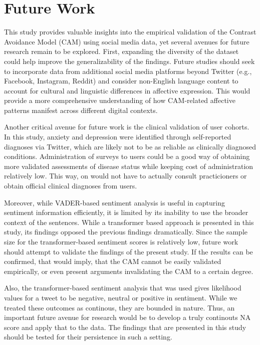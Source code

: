 

\section{Future Work}

This study provides valuable insights into the empirical validation of the Contrast Avoidance Model (CAM) using social media data, yet several avenues for future research remain to be explored. First, expanding the diversity of the dataset could help improve the generalizability of the findings. Future studies should seek to incorporate data from additional social media platforms beyond Twitter (e.g., Facebook, Instagram, Reddit) and consider non-English language content to account for cultural and linguistic differences in affective expression. This would provide a more comprehensive understanding of how CAM-related affective patterns manifest across different digital contexts.

Another critical avenue for future work is the clinical validation of user cohorts. In this study, anxiety and depression were identified through self-reported diagnoses via Twitter, which are likely not to be as reliable as clinically diagnosed conditions. Administration of surveys to users could be a good way of obtaining more validated assessments of disease status while keeping cost of administration relatively low. This way, on would not have to actually consult practicioners or obtain official clinical diagnoses from users.

Moreover, while VADER-based sentiment analysis is useful in capturing sentiment information efficiently, it is limited by its inability to use the broader context of the sentences. While a transformer based approach is presented in this study, its findings opposed the previous findings dramatically. Since the sample size for the transformer-based sentiment scores is relatively low, future work should attempt to validate the findings of the present study. If the results can be confirmed, that would imply, that the CAM cannot be easily validated empirically, or even present arguments invalidating the CAM to a certain degree.

Also, the transformer-based sentiment analysis that was used gives likelihood values for a tweet to be negative, neutral or positive in sentiment. While we treated these outcomes as continous, they are bounded in nature. Thus, an important future avenue for research would be to develop a truly continouts NA score and apply that to the data. The findings that are presented in this study should be tested for their persistence in such a setting.

